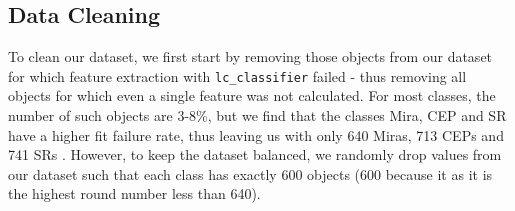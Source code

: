 \documentclass[conference]{IEEEtran}
\begin{document}

\subsection{Data Cleaning} \label{subsec:data_cleaning}
To clean our dataset, we first start by removing those objects from our dataset for which feature extraction with \texttt{lc\_classifier} failed - thus removing all objects for which even a single feature was not calculated. For most classes, the number of such objects are 3-8\%, but we find that the classes Mira, CEP and SR have a higher fit failure rate, thus leaving us with only 640 Miras, 713 CEPs and 741 SRs . However, to keep the dataset balanced, we randomly drop values from our dataset such that each class has exactly 600 objects (600 because it as it is the highest round number less than 640).
\end{document}
